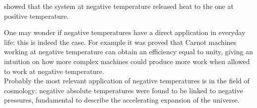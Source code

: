 showed that the system at negative temperature released heat to the one at positive temperature. \par 
One may wonder if negative temperatures have a direct application in everyday life: this is indeed the case. For example it was proved that Carnot machines working at negative temperature can obtain an efficiency equal to unity, 
giving an intuition on how more complex machines could produce more work when allowed to work at negative temperature. \\
Probably the most relevant application of negative temperatures is in the field of cosmology: negative absolute temperatures were found to be linked to negative pressures, fundamental to describe the accelerating expansion of the universe.